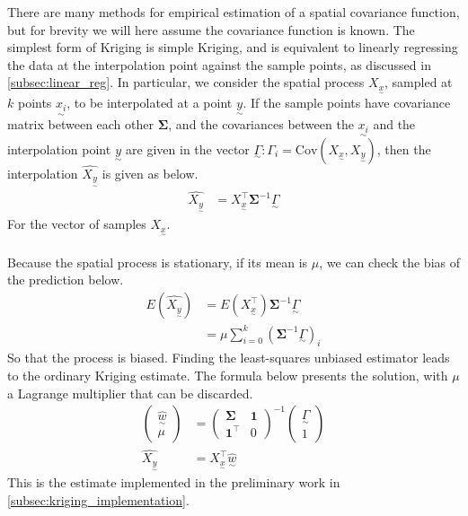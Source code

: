\documentclass[12pt,a4paper]{article} %
\newcommand{\ve}[1]{\underset{\sim}{#1}}
\begin{document}
There are many methods for empirical estimation of a spatial covariance function, but for brevity we will here assume the covariance function is known. The simplest form of Kriging is simple Kriging, and is equivalent to linearly regressing the data at the interpolation point against the sample points, as discussed in \ref{subsec:linear_reg}. In particular, we consider the spatial process $X_{\ve{x}}$, sampled at $k$ points $\ve{x_i}$, to be interpolated at a point $\ve{y}$. If the sample points have covariance matrix between each other $\pmb{\Sigma}$, and the covariances between the $\ve{x_i}$ and the interpolation point $\ve{y}$ are given in the vector $\ve{\Gamma}:\Gamma_i=\text{Cov}(X_{\ve{x}},X_{\ve{y}})$, then the interpolation $\hat{X_{\ve{y}}}$ is given as below.
\begin{align*}
    \hat{X_{\ve{y}}}&=X_{\ve{x}}^\top\pmb{\Sigma}^{-1}\ve{\Gamma}
\end{align*}
For the vector of samples $X_{\ve{x}}$.\\\\
Because the spatial process is stationary, if its mean is $\mu$, we can check the bias of the prediction below.
\begin{align*}
    E(\hat{X_{\ve{y}}})&=E(X_{\ve{x}}^\top)\pmb{\Sigma}^{-1}\ve{\Gamma}\\
    &=\mu\sum_{i=0}^k(\pmb{\Sigma}^{-1}\ve{\Gamma})_i
\end{align*}
So that the process is biased. Finding the least-squares unbiased estimator leads to the ordinary Kriging estimate. The formula below presents the solution, with $\mu$ a Lagrange multiplier that can be discarded.
\begin{align*}
    \begin{pmatrix}
        \hat{\ve{w}}\\
        \mu
    \end{pmatrix}&=\begin{pmatrix}
        \pmb{\Sigma} & \mathbf{1}\\
        \mathbf{1}^\top & 0
    \end{pmatrix}^{-1}\begin{pmatrix}
        \ve{\Gamma}\\
        1
    \end{pmatrix}\\
    \hat{X_{\ve{y}}}&=X_{\ve{x}}^\top \hat{\ve{w}}
\end{align*}
This is the estimate implemented in the preliminary work in \ref{subsec:kriging_implementation}.\\\\
\end{document}
